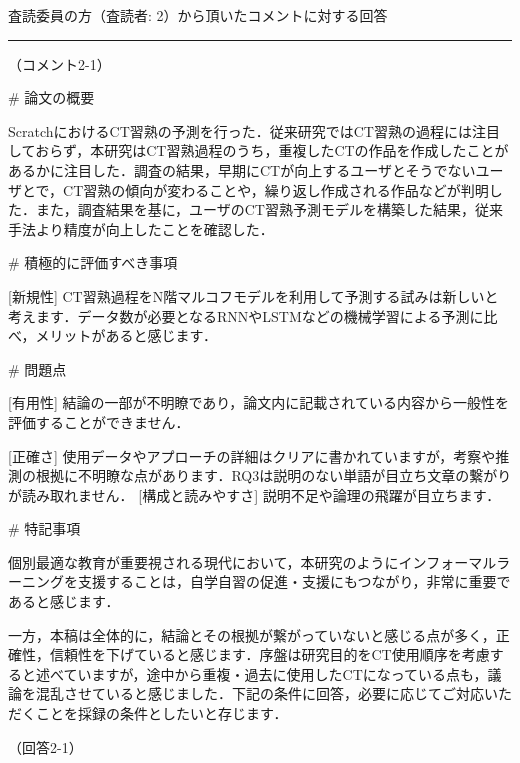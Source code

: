 \documentclass{jarticle} %
\def\section#1{ \vspace{3pc} {\large \gt #1} \vspace{1pc} \hrule }
\def\subsection#1{ \vspace{1pc} {\gt #1} }
\begin{document}
\newpage
\section{査読委員の方（査読者: 2）から頂いたコメントに対する回答}

\subsection{（コメント2-1）}

\# 論文の概要

ScratchにおけるCT習熟の予測を行った．従来研究ではCT習熟の過程には注目しておらず，本研究はCT習熟過程のうち，重複したCTの作品を作成したことがあるかに注目した．調査の結果，早期にCTが向上するユーザとそうでないユーザとで，CT習熟の傾向が変わることや，繰り返し作成される作品などが判明した．また，調査結果を基に，ユーザのCT習熟予測モデルを構築した結果，従来手法より精度が向上したことを確認した．

\# 積極的に評価すべき事項

[新規性] CT習熟過程をN階マルコフモデルを利用して予測する試みは新しいと考えます．データ数が必要となるRNNやLSTMなどの機械学習による予測に比べ，メリットがあると感じます．

\# 問題点

[有用性] 結論の一部が不明瞭であり，論文内に記載されている内容から一般性を評価することができません．

[正確さ] 使用データやアプローチの詳細はクリアに書かれていますが，考察や推測の根拠に不明瞭な点があります．RQ3は説明のない単語が目立ち文章の繋がりが読み取れません．
[構成と読みやすさ] 説明不足や論理の飛躍が目立ちます．

\# 特記事項

個別最適な教育が重要視される現代において，本研究のようにインフォーマルラーニングを支援することは，自学自習の促進・支援にもつながり，非常に重要であると感じます．

一方，本稿は全体的に，結論とその根拠が繋がっていないと感じる点が多く，正確性，信頼性を下げていると感じます．序盤は研究目的をCT使用順序を考慮すると述べていますが，途中から重複・過去に使用したCTになっている点も，議論を混乱させていると感じました．下記の条件に回答，必要に応じてご対応いただくことを採録の条件としたいと存じます．

\subsection{（回答2-1）}
\end{document}
